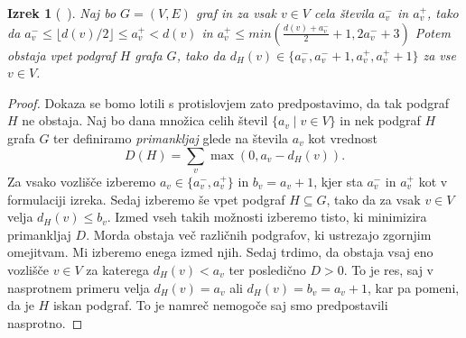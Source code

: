 \documentclass[12pt,a4paper,twoside]{article}
\theoremstyle{definition} %
\theoremstyle{plain} %
\newtheorem{izrek}[definicija]{Izrek}
\numberwithin{equation}{section}  %
\begin{document}
\begin{izrek}[~\citet{random12}]
\label{factor}
Naj bo $G = (V, E)$ graf in za vsak $v \in V$ cela števila $a_v^-$ in $a_v^+$, tako da $a_v^- \le \lfloor d(v)/2 \rfloor \le a_v^+ < d(v)$ in $a_v^+ \le min \left( \frac{d(v) + a_v^-}{2} + 1, 2a_v^- + 3 \right)$ Potem obstaja vpet podgraf $H$ grafa $G$, tako da $d_H(v) \in \{ a_v^-, a_v^- + 1, a_v^+, a_v^+ + 1\}$ za vse $v \in V$.
\end{izrek}

\begin{proof}
Dokaza se bomo lotili s protislovjem zato predpostavimo, da tak podgraf $H$ ne obstaja. Naj bo dana množica celih števil $\{ a_v  \mid v \in V\}$ in nek podgraf $H$ grafa $G$ ter definiramo \textit{primankljaj} glede na števila $a_v$ kot vrednost
$$D(H)= \sum_v \max(0, a_v - d_H(v)) .$$ 
Za vsako vozlišče izberemo $a_v \in \{a_v^-, a_v^+\}$ in $b_v = a_v +1$, kjer sta $a_v^-$ in $a_v^+$ kot v formulaciji izreka. Sedaj izberemo še vpet podgraf $H \subseteq G$, tako da za vsak $v \in V$ velja $d_H(v) \le b_v$. Izmed vseh takih možnosti izberemo tisto, ki minimizira primankljaj $D$. Morda obstaja več različnih podgrafov, ki ustrezajo zgornjim omejitvam. Mi izberemo enega izmed njih.  Sedaj trdimo, da obstaja vsaj eno vozlišče $v \in V$ za katerega $d_H(v) < a_v$ ter posledično $D > 0$. To je res, saj v nasprotnem primeru  velja $d_H(v) = a_v$ ali $d_H(v) = b_v = a_v + 1$, kar pa pomeni, da je $H$ iskan podgraf. To je namreč nemogoče saj smo predpostavili nasprotno.


\end{proof}
\end{document}
